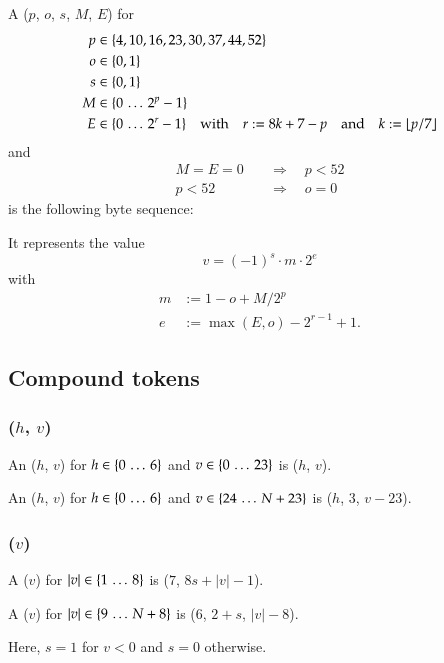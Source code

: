 A \DborBinaryRationalToken($p$, $o$, $s$, $M$, $E$) for
\begin{align*}
    p & \in \{4, 10, 16, 23, 30, 37, 44, 52\} \\
    o & \in \{0, 1\} \\
    s & \in \{0, 1\} \\
    M & \in \{0 \,\ldots\, 2^p - 1\} \\
    E & \in \{0 \,\ldots\, 2^r - 1\}
        \quad\text{with}\quad r := 8 k + 7 - p
        \quad\text{and}\quad k := \lfloor p / 7 \rfloor
\end{align*}%
and
\begin{align*}
    M = E = 0 \quad & \Rightarrow \quad p < 52 \\
    p < 52 \quad & \Rightarrow \quad o = 0
\end{align*}%
is the following byte sequence:


It represents the value
\begin{equation}
    v = (-1)^s \cdot m \cdot 2^e
\end{equation}
with
\begin{align*}
    m & := 1 - o + M / 2^p \\
    e & := \max(E, o) - 2^{r-1} + 1.
\end{align*}


\subsection{Compound tokens}

\subsubsection{\DborIntegerToken(\texorpdfstring{$h$, $v$}{h, v})}
\hypertarget{sec:def:IntegerToken}{}

An \DborIntegerToken($h$, $v$) for $h \in \{0 \,\ldots\, 6\}$ and
$v \in \{0 \,\ldots\, 23\}$ is \DborMinimalToken*($h$, $v$).

An \DborIntegerToken($h$, $v$) for $h \in \{0 \,\ldots\, 6\}$ and
$v \in \{24 \,\ldots\, N + 23\}$
is \DborNaturalToken*($h$, $3$, $v - 23$).


\subsubsection{\DborPowerOfTenToken(\texorpdfstring{$v$}{v})}
\hypertarget{sec:def:PowerOfTenToken}{}

A \DborPowerOfTenToken($v$) for $|v| \in \{1 \,\ldots\, 8\}$ is
\DborMinimalToken*($7$, $8 s + |v| - 1$).

A \DborPowerOfTenToken($v$) for $|v| \in \{9 \,\ldots\, N + 8\}$ is
\DborNaturalToken*($6$, $2 + s$, $|v| - 8$).

Here, $s = 1$ for $v < 0$ and $s = 0$ otherwise.
